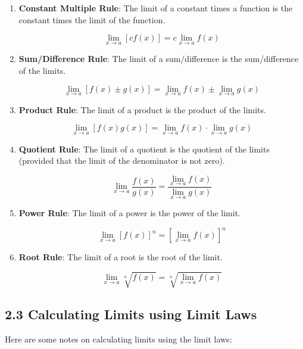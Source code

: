 \documentclass{article}
\begin{document}
\begin{enumerate}
\item \textbf{Constant Multiple Rule}: The limit of a constant times a function is the constant times the limit of the function.

    \[ \lim_{x \to a} [cf(x)] = c \lim_{x \to a} f(x) \]

\item \textbf{Sum/Difference Rule}: The limit of a sum/difference is the sum/difference of the limits.

    \[ \lim_{x \to a} [f(x) \pm g(x)] = \lim_{x \to a} f(x) \pm \lim_{x \to a} g(x) \]

\item \textbf{Product Rule}: The limit of a product is the product of the limits.

    \[ \lim_{x \to a} [f(x)g(x)] = \lim_{x \to a} f(x) \cdot \lim_{x \to a} g(x) \]

\item \textbf{Quotient Rule}: The limit of a quotient is the quotient of the limits (provided that the limit of the denominator is not zero).

    \[ \lim_{x \to a} \frac{f(x)}{g(x)} = \frac{\lim_{x \to a} f(x)}{\lim_{x \to a} g(x)} \]

\item \textbf{Power Rule}: The limit of a power is the power of the limit.

    \[ \lim_{x \to a} [f(x)]^n = [\lim_{x \to a} f(x)]^n \]

\item \textbf{Root Rule}: The limit of a root is the root of the limit.

    \[ \lim_{x \to a} \sqrt[n]{f(x)} = \sqrt[n]{\lim_{x \to a} f(x)} \]
\end{enumerate}

\subsection{2.3 Calculating Limits using Limit Laws}

Here are some notes on calculating limits using the limit laws:
\end{document}
